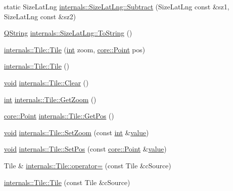 \begin{DoxyCompactItemize}
\item 
static Size\-Lat\-Lng \hyperlink{group___o_p_map_widget_ga6e437e3b3d5fd023b4afec09ad37928e}{internals\-::\-Size\-Lat\-Lng\-::\-Subtract} (Size\-Lat\-Lng const \&sz1, Size\-Lat\-Lng const \&sz2)
\item 
\hyperlink{group___u_a_v_objects_plugin_gab9d252f49c333c94a72f97ce3105a32d}{Q\-String} \hyperlink{group___o_p_map_widget_ga70356ecffc32e8609752c282f95c7183}{internals\-::\-Size\-Lat\-Lng\-::\-To\-String} ()
\item 
\hyperlink{group___o_p_map_widget_ga60a32de8eb056679d219587b8caf1237}{internals\-::\-Tile\-::\-Tile} (\hyperlink{ioapi_8h_a787fa3cf048117ba7123753c1e74fcd6}{int} zoom, \hyperlink{structcore_1_1_point}{core\-::\-Point} pos)
\item 
\hyperlink{group___o_p_map_widget_ga0dbddb1e894ab49cd9965e12002f3969}{internals\-::\-Tile\-::\-Tile} ()
\item 
\hyperlink{group___u_a_v_objects_plugin_ga444cf2ff3f0ecbe028adce838d373f5c}{void} \hyperlink{group___o_p_map_widget_ga827a2b95ce33f4a2dcbb98cd1b94ea65}{internals\-::\-Tile\-::\-Clear} ()
\item 
\hyperlink{ioapi_8h_a787fa3cf048117ba7123753c1e74fcd6}{int} \hyperlink{group___o_p_map_widget_ga8f3669a9492cdfacd22026ef7456735d}{internals\-::\-Tile\-::\-Get\-Zoom} ()
\item 
\hyperlink{structcore_1_1_point}{core\-::\-Point} \hyperlink{group___o_p_map_widget_gacdfd78f26efd7d893ba5329145465096}{internals\-::\-Tile\-::\-Get\-Pos} ()
\item 
\hyperlink{group___u_a_v_objects_plugin_ga444cf2ff3f0ecbe028adce838d373f5c}{void} \hyperlink{group___o_p_map_widget_gada2e44d9a3bcfa1e07e8220944335692}{internals\-::\-Tile\-::\-Set\-Zoom} (const \hyperlink{ioapi_8h_a787fa3cf048117ba7123753c1e74fcd6}{int} \&\hyperlink{glext_8h_aa0e2e9cea7f208d28acda0480144beb0}{value})
\item 
\hyperlink{group___u_a_v_objects_plugin_ga444cf2ff3f0ecbe028adce838d373f5c}{void} \hyperlink{group___o_p_map_widget_gabc58fab03485a97b6d6dbb4982ebf677}{internals\-::\-Tile\-::\-Set\-Pos} (const \hyperlink{structcore_1_1_point}{core\-::\-Point} \&\hyperlink{glext_8h_aa0e2e9cea7f208d28acda0480144beb0}{value})
\item 
Tile \& \hyperlink{group___o_p_map_widget_ga00b02eca9e95aed841be1192fbd16e74}{internals\-::\-Tile\-::operator=} (const Tile \&c\-Source)
\item 
\hyperlink{group___o_p_map_widget_ga18b470118154d71c8f34a805c8bcc782}{internals\-::\-Tile\-::\-Tile} (const Tile \&c\-Source)

\end{DoxyCompactItemize}
